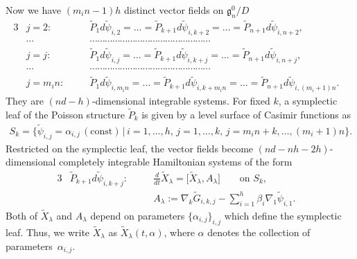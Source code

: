 \documentclass[pdftex]{sigma}
\numberwithin{equation}{section}
\begin{document}
Now we have $(m_in-1)h$ distinct vector f\/ields on $\mathfrak{g}^0_n/D$
\begin{alignat*}{3}
&j=2\colon \quad && \widetilde{P}_1 d\widetilde{\psi}_{i,2} = \dots =
 \widetilde{P}_{k+1}d\widetilde{\psi}_{i,k+2}=\dots =\widetilde{P}_{n+1}d\widetilde{\psi}_{i,n+2}, & \\
&\cdots && \cdots\cdots\cdots\cdots\cdots\cdots\cdots\cdots\cdots\cdots\cdots\cdots\cdots\cdots\cdots\cdots &\\
&j=j\colon\quad && \widetilde{P}_1 d\widetilde{\psi}_{i,j} = \dots =
 \widetilde{P}_{k+1}d\widetilde{\psi}_{i,k+j}=\dots =\widetilde{P}_{n+1}d\widetilde{\psi}_{i,n+j}, & \\
&\cdots && \cdots\cdots\cdots\cdots\cdots\cdots\cdots\cdots\cdots\cdots\cdots\cdots\cdots\cdots\cdots\cdots &\\
&j=m_in\colon \quad && \widetilde{P}_1 d\widetilde{\psi}_{i,m_in} = \dots =
 \widetilde{P}_{k+1}d\widetilde{\psi}_{i,k+m_in}=\dots =\widetilde{P}_{n+1}d\widetilde{\psi}_{i,(m_i+1)n}.
\end{alignat*}
They are $(nd-h)$-dimensional integrable systems. For f\/ixed $k$, a symplectic leaf of the Poisson structure $\widetilde{P}_k$ is given by a level surface of Casimir functions as
\begin{gather*}
S_k = \big\{ \widetilde{\psi}_{i,j} = \alpha _{i,j}\, (\text{const}) \, | \, i=1,\dots ,h,\, j=1,\dots ,k,\, j=m_in+k,\dots ,(m_i+1)n\big\}.
\end{gather*}
Restricted on the symplectic leaf, the vector f\/ields become $(nd-nh-2h)$-dimensional completely integrable Hamiltonian systems of the form
\begin{alignat}{3}
& \widetilde{P}_{k+1}d\widetilde{\psi}_{i,k+j}\colon \quad & & \frac{d}{dt}\widetilde{X}_\lambda
 = \big[\widetilde{X}_\lambda , A_\lambda \big] \qquad \text{on $S_k$},& \label{2-7} \\
& && A_\lambda :=\nabla _k\widetilde{G}_{i,k,j}-\sum^h_{i=1}\beta_i \nabla _1 \widetilde{\psi}_{i,1}. & \nonumber
\end{alignat}
Both of $\widetilde{X}_\lambda $ and $A_\lambda $ depend on parameters $\{ \alpha _{i,j}\}_{i,j}$ which def\/ine the symplectic leaf. Thus, we write $\widetilde{X}_\lambda $ as $\widetilde{X}_\lambda (t, \alpha )$, where $\alpha $ denotes the collection of parameters~$\alpha _{i,j}$.
\end{document}
